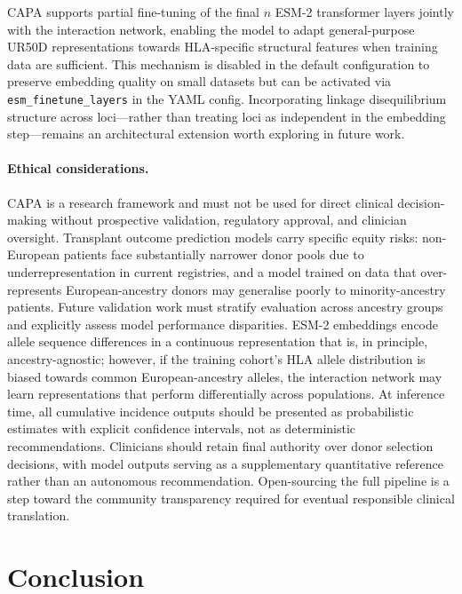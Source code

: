 \documentclass[11pt,a4paper]{article}
\begin{document}
CAPA supports partial fine-tuning of the final $n$ ESM-2
transformer layers jointly with the interaction network, enabling the model to
adapt general-purpose UR50D representations towards HLA-specific structural
features when training data are sufficient.  This mechanism is disabled in the
default configuration to preserve embedding quality on small datasets but can
be activated via \texttt{esm\_finetune\_layers} in the YAML config.
Incorporating linkage disequilibrium structure across loci---rather than
treating loci as independent in the embedding step---remains an architectural
extension worth exploring in future work.

\paragraph{Ethical considerations.}
CAPA is a research framework and must not be used for direct clinical
decision-making without prospective validation, regulatory approval, and
clinician oversight.  Transplant outcome prediction models carry specific
equity risks: non-European patients face substantially narrower donor pools
due to underrepresentation in current registries, and a model trained on
data that over-represents European-ancestry donors may generalise poorly to
minority-ancestry patients.  Future validation work must stratify evaluation
across ancestry groups and explicitly assess model performance disparities.
ESM-2 embeddings encode allele sequence differences in a continuous
representation that is, in principle, ancestry-agnostic; however, if the
training cohort's HLA allele distribution is biased towards common
European-ancestry alleles, the interaction network may learn representations
that perform differentially across populations.  At inference time, all
cumulative incidence outputs should be presented as probabilistic estimates
with explicit confidence intervals, not as deterministic recommendations.
Clinicians should retain final authority over donor selection decisions, with
model outputs serving as a supplementary quantitative reference rather than
an autonomous recommendation.  Open-sourcing the full pipeline is a step
toward the community transparency required for eventual responsible clinical
translation.

\section{Conclusion}
\end{document}
